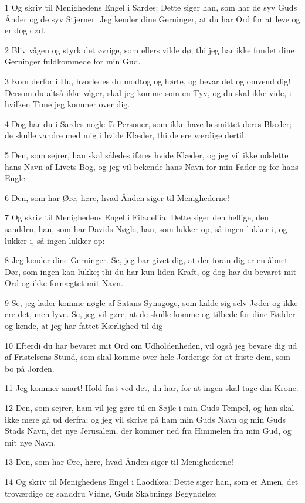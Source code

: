 \par 1 Og skriv til Menighedens Engel i Sardes: Dette siger han, som har de syv Guds Ånder og de syv Stjerner: Jeg kender dine Gerninger, at du har Ord for at leve og er dog død.
\par 2 Bliv vågen og styrk det øvrige, som ellers vilde dø; thi jeg har ikke fundet dine Gerninger fuldkommede for min Gud.
\par 3 Kom derfor i Hu, hvorledes du modtog og hørte, og bevar det og omvend dig! Dersom du altså ikke våger, skal jeg komme som en Tyv, og du skal ikke vide, i hvilken Time jeg kommer over dig.
\par 4 Dog har du i Sardes nogle få Personer, som ikke have besmittet deres Blæder; de skulle vandre med mig i hvide Klæder, thi de ere værdige dertil.
\par 5 Den, som sejrer, han skal således iføres hvide Klæder, og jeg vil ikke udslette hans Navn af Livets Bog, og jeg vil bekende hans Navn for min Fader og for hans Engle.
\par 6 Den, som har Øre, høre, hvad Ånden siger til Menighederne!
\par 7 Og skriv til Menighedens Engel i Filadelfia: Dette siger den hellige, den sanddru, han, som har Davids Nøgle, han, som lukker op, så ingen lukker i, og lukker i, så ingen lukker op:
\par 8 Jeg kender dine Gerninger. Se, jeg bar givet dig, at der foran dig er en åbnet Dør, som ingen kan lukke; thi du har kun liden Kraft, og dog har du bevaret mit Ord og ikke fornægtet mit Navn.
\par 9 Se, jeg lader komme nøgle af Satans Synagoge, som kalde sig selv Jøder og ikke ere det, men lyve. Se, jeg vil gøre, at de skulle komme og tilbede for dine Fødder og kende, at jeg har fattet Kærlighed til dig
\par 10 Efterdi du har bevaret mit Ord om Udholdenheden, vil også jeg bevare dig ud af Fristelsens Stund, som skal komme over hele Jorderige for at friste dem, som bo på Jorden.
\par 11 Jeg kommer snart! Hold fast ved det, du har, for at ingen skal tage din Krone.
\par 12 Den, som sejrer, ham vil jeg gøre til en Søjle i min Guds Tempel, og han skal ikke mere gå ud derfra; og jeg vil skrive på ham min Guds Navn og min Guds Stads Navn, det nye Jerusalem, der kommer ned fra Himmelen fra min Gud, og mit nye Navn.
\par 13 Den, som har Øre, høre, hvad Ånden siger til Menighederne!
\par 14 Og skriv til Menighedens Engel i Laodikea: Dette siger han, som er Amen, det troværdige og sanddru Vidne, Guds Skabnings Begyndelse:
